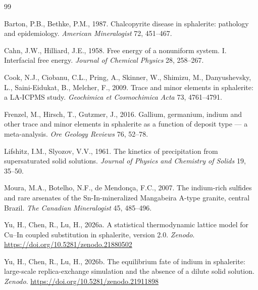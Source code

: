 \documentclass[11pt,a4paper]{ctexart}
\begin{document}
\begin{thebibliography}{99}
\itemsep2pt

Barton, P.B., Bethke, P.M., 1987. Chalcopyrite disease in sphalerite: pathology
and epidemiology. \textit{American Mineralogist} 72, 451--467.

Cahn, J.W., Hilliard, J.E., 1958. Free energy of a nonuniform system. I.
Interfacial free energy. \textit{Journal of Chemical Physics} 28, 258--267.

Cook, N.J., Ciobanu, C.L., Pring, A., Skinner, W., Shimizu, M., Danyushevsky,
L., Saini-Eidukat, B., Melcher, F., 2009. Trace and minor elements in
sphalerite: a LA-ICPMS study. \textit{Geochimica et Cosmochimica Acta} 73,
4761--4791.

Frenzel, M., Hirsch, T., Gutzmer, J., 2016. Gallium, germanium, indium and
other trace and minor elements in sphalerite as a function of deposit type ---
a meta-analysis. \textit{Ore Geology Reviews} 76, 52--78.

Lifshitz, I.M., Slyozov, V.V., 1961. The kinetics of precipitation from
supersaturated solid solutions. \textit{Journal of Physics and Chemistry of
Solids} 19, 35--50.

Moura, M.A., Botelho, N.F., de Mendon\c{c}a, F.C., 2007. The indium-rich
sulfides and rare arsenates of the Sn-In-mineralized Mangabeira A-type granite,
central Brazil. \textit{The Canadian Mineralogist} 45, 485--496.

Yu, H., Chen, R., Lu, H., 2026a. A statistical thermodynamic lattice model for
Cu--In coupled substitution in sphalerite, version 2.0. \textit{Zenodo}.
\url{https://doi.org/10.5281/zenodo.21880502}

Yu, H., Chen, R., Lu, H., 2026b. The equilibrium fate of indium in sphalerite:
large-scale replica-exchange simulation and the absence of a dilute solid
solution. \textit{Zenodo}. \url{https://doi.org/10.5281/zenodo.21911898}

\end{thebibliography}
\end{document}
